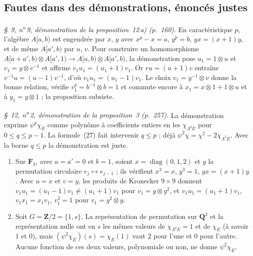 \subsection*{Fautes dans des démonstrations, énoncés justes}

\emph{§~9, n\textsuperscript{o}\,9, démonstration de la proposition~12\,a) (p.~160).} En caractéristique $p$, l'algèbre $A[a,b)$ est engendrée par $x$, $y$ avec $x^p - x = a$, $y^p = b$, $yx = (x+1)y$, et de même $A[a', b)$ par $u$, $v$. Pour construire un homomorphisme $A[a + a', b) \otimes A[a', 1) \to A[a,b) \otimes A[a',b)$, la démonstration pose $u_1 = 1 \otimes u$ et $v_1 = y \otimes v^{-1}$ et affirme $v_1 u_1 = (u_1 + 1) v_1$. Or $vu = (u+1)v$ entraîne $v^{-1}u = (u - 1)v^{-1}$, d'où $v_1 u_1 = (u_1 - 1)v_1$. Le choix $v_1 = y^{-1} \otimes v$ donne la bonne relation, vérifie $v_1^p = b^{-1} \otimes b = 1$ et commute encore à $x_1 = x \otimes 1 + 1 \otimes u$ et à $y_1 = y \otimes 1$ ; la proposition subsiste.

\emph{§~12, n\textsuperscript{o}\,2, démonstration de la proposition~3 (p.~257).} La démonstration exprime $\psi^p \chi_E$ comme polynôme à coefficients entiers en les $\chi_{\Lambda^q E}$ pour $0 \le q \le p-1$. La formule~(27) fait intervenir $q \le p$ ; déjà $\psi^2\chi = \chi^2 - 2\chi_{\Lambda^2 E}$. Avec la borne $q \le p$ la démonstration est juste.

\begin{encadre}
\begin{contrexemple}
\begin{enumerate}
\item[e)] Sur $\mathbf F_3$, avec $a = a' = 0$ et $b = 1$, soient $x = \operatorname{diag}(0, 1, 2)$ et $y$ la permutation circulaire $e_j \mapsto e_{j-1}$ ; ils vérifient $x^3 = x$, $y^3 = 1$, $yx = (x+1)y$. Avec $u = x$ et $v = y$, les produits de Kronecker $9 \times 9$ donnent $v_1 u_1 = (u_1 - 1)v_1 \neq (u_1 + 1)v_1$ pour $v_1 = y \otimes y^2$, et $v_1 u_1 = (u_1 + 1)v_1$, $v_1 x_1 = x_1 v_1$, $v_1^3 = 1$ pour $v_1 = y^2 \otimes y$.
\item[f)] Soit $G = \mathbf Z/2 = \{1, s\}$. La représentation de permutation sur $\mathbf Q^2$ et la représentation nulle ont en $s$ les mêmes valeurs de $\chi_{\Lambda^0 E} = 1$ et de $\chi_E$ (à savoir $1$ et $0$), mais $(\psi^2\chi_E)(s) = \chi_E(1)$ vaut $2$ pour l'une et $0$ pour l'autre. Aucune fonction de ces deux valeurs, polynomiale ou non, ne donne $\psi^2\chi_E$.
\end{enumerate}
\end{contrexemple}
\end{encadre}

